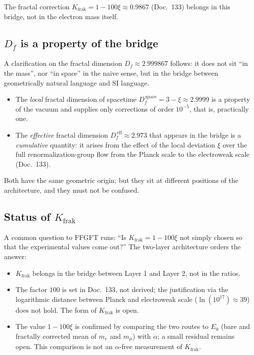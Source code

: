 The fractal correction $K_{\mathrm{frak}} = 1 - 100\xi \approx 0{.}9867$
(Doc.~133) belongs in this bridge, not in the electron mass itself.

\subsection{$D_f$ is a property of the bridge}

A clarification on the fractal dimension $D_{f} \approx 2{.}999867$
follows: it does not sit ``in the mass'', nor ``in space'' in the
naive sense, but in the bridge between geometrically natural
language and SI language.

\begin{itemize}\setlength\itemsep{0pt}
  \item The \emph{local} fractal dimension of spacetime
        $D_{f}^{\,\text{space}} = 3 - \xi \approx 2{.}9999$ is a
        property of the vacuum and supplies only corrections of order
        $10^{-5}$, that is, practically one.
  \item The \emph{effective} fractal dimension
        $D_{f}^{\,\text{eff}} \approx 2{.}973$ that appears in the
        bridge is a \emph{cumulative} quantity: it arises from the
        effect of the local deviation $\xi$ over the full
        renormalization-group flow from the Planck scale to the
        electroweak scale (Doc.~133).
\end{itemize}

Both have the same geometric origin; but they sit at different
positions of the architecture, and they must not be confused.

\subsection{Status of $K_{\mathrm{frak}}$}

A common question to FFGFT runs: ``Is $K_{\mathrm{frak}} = 1 - 100\xi$
not simply chosen so that the experimental values come out?'' The
two-layer architecture orders the answer:

\begin{itemize}\setlength\itemsep{0pt}
  \item $K_{\mathrm{frak}}$ belongs in the bridge between Layer 1 and
        Layer 2, not in the ratios.
  \item The factor $100$ is set in Doc.~133, not derived; the
        justification via the logarithmic distance between Planck and
        electroweak scale ($\ln(10^{17}) \approx 39$) does not hold.
        The form of $K_{\mathrm{frak}}$ is open.
  \item The value $1 - 100\xi$ is confirmed by comparing the two routes
        to $E_0$ (bare and fractally corrected mean of $m_e$ and
        $m_\mu$) with $\alpha$; a small residual remains open. This
        comparison is not an $\alpha$-free measurement of
        $K_{\mathrm{frak}}$.
\end{itemize}

